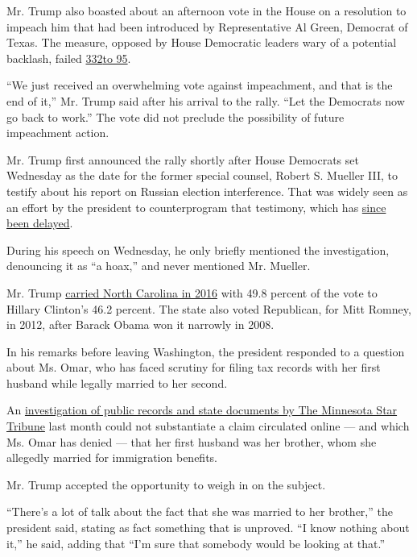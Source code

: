 Mr. Trump also boasted about an afternoon vote in the House on a
resolution to impeach him that had been introduced by Representative Al
Green, Democrat of Texas. The measure, opposed by House Democratic
leaders wary of a potential backlash, failed
\href{https://www.nytimes.com/2019/07/17/us/politics/house-impeachment-trump.html}{332}\href{https://www.nytimes.com/2019/07/17/us/politics/house-impeachment-trump.html?action=click\&module=Top\%20Stories\&pgtype=Homepage}{to
95}.

``We just received an overwhelming vote against impeachment, and that is
the end of it,'' Mr. Trump said after his arrival to the rally. ``Let
the Democrats now go back to work.'' The vote did not preclude the
possibility of future impeachment action.

Mr. Trump first announced the rally shortly after House Democrats set
Wednesday as the date for the former special counsel, Robert S. Mueller
III, to testify about his report on Russian election interference. That
was widely seen as an effort by the president to counterprogram that
testimony, which has
\href{https://www.nytimes.com/2019/07/12/us/politics/house-democrats-mueller-hearings.html}{since
been delayed}.

During his speech on Wednesday, he only briefly mentioned the
investigation, denouncing it as ``a hoax,'' and never mentioned Mr.
Mueller.

Mr. Trump
\href{https://www.nytimes.com/elections/2016/results/north-carolina}{carried
North Carolina in 2016} with 49.8 percent of the vote to Hillary
Clinton's 46.2 percent. The state also voted Republican, for Mitt
Romney, in 2012, after Barack Obama won it narrowly in 2008.

In his remarks before leaving Washington, the president responded to a
question about Ms. Omar, who has faced scrutiny for filing tax records
with her first husband while legally married to her second.

An
\href{http://www.startribune.com/new-documents-revisit-questions-about-rep-ilhan-omar-s-marriage/511681362/}{investigation
of public records and state documents by The Minnesota Star Tribune}
last month could not substantiate a claim circulated online --- and
which Ms. Omar has denied --- that her first husband was her brother,
whom she allegedly married for immigration benefits.

Mr. Trump accepted the opportunity to weigh in on the subject.

``There's a lot of talk about the fact that she was married to her
brother,'' the president said, stating as fact something that is
unproved. ``I know nothing about it,'' he said, adding that ``I'm sure
that somebody would be looking at that.''

